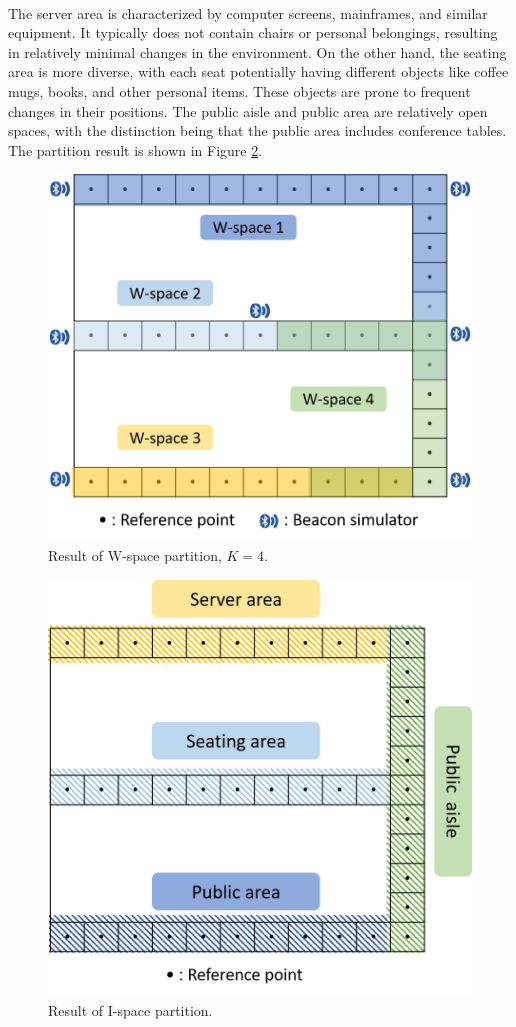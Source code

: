 \documentclass[a4paper,12pt]{report}
\begin{document}
\paragraph{}
The server area is characterized by computer screens, mainframes, and similar equipment. It typically does not contain chairs or personal belongings, resulting in relatively minimal changes in the environment. On the other hand, the seating area is more diverse, with each seat potentially having different objects like coffee mugs, books, and other personal items. These objects are prone to frequent changes in their positions. The public aisle and public area are relatively open spaces, with the distinction being that the public area includes conference tables. The partition result is shown in Figure \ref{Fig:ispace_partition}.
\begin{figure}[h]
    \centering
    \includegraphics[width=0.5\columnwidth]{images/chap3/wspace_partition.png}
    \caption{Result of W-space partition, $K=4$.}
    \label{Fig:wspace_partition}
\end{figure}
\begin{figure}[h]
    \centering
    \includegraphics[width=0.5\columnwidth]{images/chap3/ispace_partition.png}
    \caption{Result of I-space partition.}
    \label{Fig:ispace_partition}
\end{figure}
\end{document}
